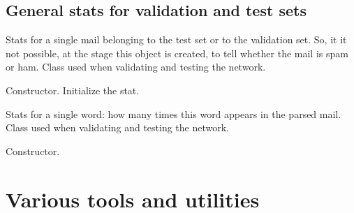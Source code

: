 \documentclass[letterpaper,10pt,english]{sphinxmanual}
\begin{document}
\section{General stats for validation and test sets}
\label{index:module-test_stat}\label{index:general-stats-for-validation-and-test-sets}

\begin{fulllineitems}
\label{index:test_stat.Test_stat}
Stats for a single mail belonging to the test set or to
the validation set. So, it it not possible, at the stage this object
is created, to tell whether the mail is spam or ham. Class used when
validating and testing the network.

\begin{fulllineitems}
\label{index:test_stat.Test_stat.__init__}
Constructor. Initialize the stat.

\end{fulllineitems}


\end{fulllineitems}


\begin{fulllineitems}
\label{index:test_stat.Test_word}
Stats for a single word: how many times this word appears in the parsed
mail. Class used when validating and testing the network.

\begin{fulllineitems}
\label{index:test_stat.Test_word.__init__}
Constructor.

\end{fulllineitems}


\end{fulllineitems}



\chapter{Various tools and utilities}
\label{index:various-tools-and-utilities}
\end{document}
